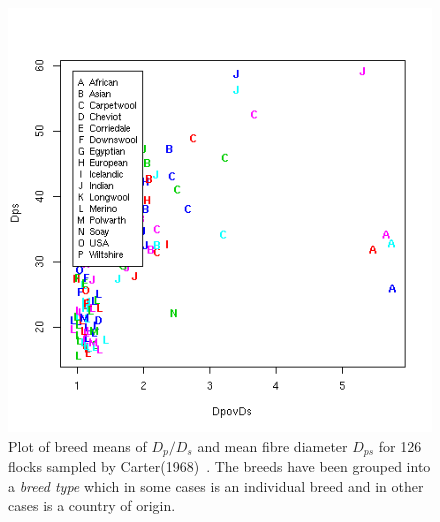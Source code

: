 %

\begin{figure}[!h]
  \centering
   \includegraphics[width=1.0\textwidth]{DpovDsDps.png}
  \caption{Plot of breed means of  $D_{p}/D_{s}$ and mean fibre diameter $D_{ps}$ for 126 flocks sampled by Carter(1968)~\cite{cart:68}. The breeds have been grouped into a {\em breed type} which in some cases is an individual breed and in other cases is a country of origin. }
  \label{fig:DpovDsDps}
\end{figure}

%

